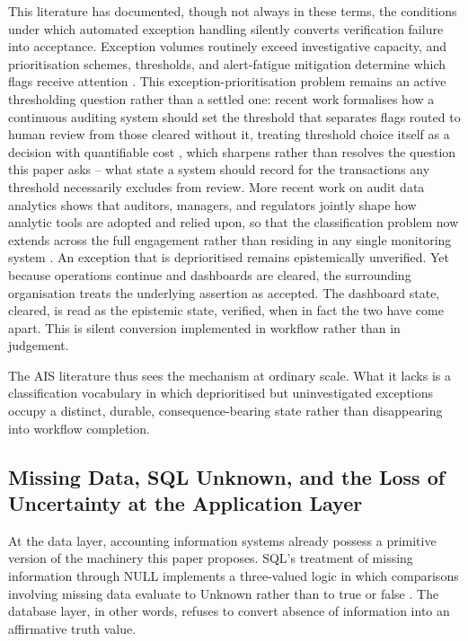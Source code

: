 \documentclass[11pt,a4paper]{article}
\theoremstyle{definition}
\theoremstyle{remark}
\begin{document}
This literature has documented, though not always in these terms, the conditions under which automated exception handling silently converts verification failure into acceptance. Exception volumes routinely exceed investigative capacity, and prioritisation schemes, thresholds, and alert-fatigue mitigation determine which flags receive attention \citep{alles2006, issa2016}. This exception-prioritisation problem remains an active thresholding question rather than a settled one: recent work formalises how a continuous auditing system should set the threshold that separates flags routed to human review from those cleared without it, treating threshold choice itself as a decision with quantifiable cost \citep{svanberg2025}, which sharpens rather than resolves the question this paper asks -- what state a system should record for the transactions any threshold necessarily excludes from review. More recent work on audit data analytics shows that auditors, managers, and regulators jointly shape how analytic tools are adopted and relied upon, so that the classification problem now extends across the full engagement rather than residing in any single monitoring system \citep{austin2021}. An exception that is deprioritised remains epistemically unverified. Yet because operations continue and dashboards are cleared, the surrounding organisation treats the underlying assertion as accepted. The dashboard state, cleared, is read as the epistemic state, verified, when in fact the two have come apart. This is silent conversion implemented in workflow rather than in judgement.

The AIS literature thus sees the mechanism at ordinary scale. What it lacks is a classification vocabulary in which deprioritised but uninvestigated exceptions occupy a distinct, durable, consequence-bearing state rather than disappearing into workflow completion.

\subsection{Missing Data, SQL Unknown, and the Loss of Uncertainty at the Application Layer}
\label{sec:lit-sql}

At the data layer, accounting information systems already possess a primitive version of the machinery this paper proposes. SQL's treatment of missing information through \textsf{NULL} implements a three-valued logic in which comparisons involving missing data evaluate to \textsf{Unknown} rather than to true or false \citep{codd1979}. The database layer, in other words, refuses to convert absence of information into an affirmative truth value.
\end{document}
